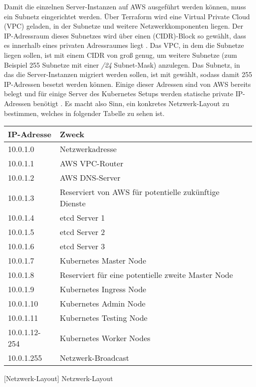 Damit die einzelnen Server-Instanzen auf AWS ausgeführt werden können, muss ein
Subnetz eingerichtet werden.
Über Terraform wird eine Virtual Private Cloud (VPC) geladen, in der Subnetze
und weitere Netzwerkkomponenten liegen.
Der IP-Adressraum dieses Subnetzes wird über einen
 (CIDR)-Block so gewählt,
dass es innerhalb eines privaten Adressraumes liegt \cite{CidrRfc}.
Das VPC, in dem die Subnetze liegen sollen, ist mit einem CIDR von
 groß genug,
um weitere Subnetze (zum Beispiel 255 Subnetze mit einer \emph{/24} Subnet-Mask)
anzulegen.
Das Subnetz, in das die Server-Instanzen migriert werden sollen, ist mit
 gewählt,
sodass damit 255 IP-Adressen besetzt werden können.
Einige dieser Adressen sind von AWS bereits belegt und für einige Server
des Kubernetes Setups werden statische private IP-Adressen benötigt
\cite{AwsVpc}.
Es macht also Sinn, ein konkretes Netzwerk-Layout zu bestimmen, welches in
folgender Tabelle zu sehen ist.

\begin{flushleft}
\centering
\begin{tabular}{ | l | l | l | }
  \hline
  IP-Adresse & Zweck \\ \hline \hline
  10.0.1.0 & Netzwerkadresse \\ \hline
  10.0.1.1 & AWS VPC-Router \\ \hline
  10.0.1.2 & AWS DNS-Server  \\ \hline
  10.0.1.3 & Reserviert von AWS für potentielle zukünftige Dienste \\ \hline
  10.0.1.4 & etcd Server 1 \\ \hline
  10.0.1.5 & etcd Server 2 \\ \hline
  10.0.1.6 & etcd Server 3 \\ \hline
  10.0.1.7 & Kubernetes Master Node \\ \hline
  10.0.1.8 & Reserviert für eine potentielle zweite Master Node \\ \hline
  10.0.1.9 & Kubernetes Ingress Node \\ \hline
  10.0.1.10 & Kubernetes Admin Node \\ \hline
  10.0.1.11 & Kubernetes Testing Node \\ \hline
  10.0.1.12-254 & Kubernetes Worker Nodes \\ \hline
  10.0.1.255 & Netzwerk-Broadcast \\ \hline
\end{tabular}
  [Netzwerk-Layout]
  {Netzwerk-Layout}
\end{flushleft}

